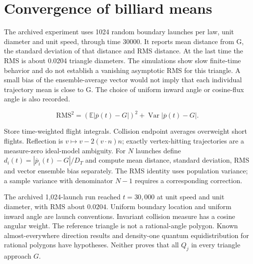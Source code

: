 \documentclass[11pt,oneside,openany]{book}
\begin{document}
\section{Convergence of billiard means}\label{sec:slide59}

The archived experiment uses 1024 random boundary launches per law, unit diameter and unit speed, through time 30000. It reports mean distance from G, the standard deviation of that distance and RMS distance. At the last time the RMS is about 0.0204 triangle diameters. The simulations show slow finite-time behavior and do not establish a vanishing asymptotic RMS for this triangle. A small bias of the ensemble-average vector would not imply that each individual trajectory mean is close to G. The choice of uniform inward angle or cosine-flux angle is also recorded.


\[\mathrm{RMS}^2=(\mathbb E|\overline p(t)-G|)^2+\operatorname{Var}|\overline p(t)-G|.\]



Store time-weighted flight integrals. Collision endpoint averages
overweight short flights. Reflection is
$v\mapsto v-2(v\cdot n)n$; exactly vertex-hitting trajectories are
a measure-zero ideal-model ambiguity.
For $N$ launches define
$d_i(t)=|\overline p_i(t)-G|/D_T$ and compute mean distance,
standard deviation, RMS and vector ensemble bias separately.
The RMS identity uses population variance; a sample variance with
denominator $N-1$ requires a corresponding correction.

The archived 1,024-launch run reached $t=30{,}000$ at unit speed and
unit diameter, with RMS about $0.0204$.
Uniform boundary location and uniform inward angle are launch
conventions. Invariant collision measure has a cosine angular weight.
The reference triangle is not a rational-angle polygon.
Known almost-everywhere direction results \cite{kms} and
density-one quantum equidistribution for rational polygons
\cite{marklof} have hypotheses. Neither proves that all $Q_j$ in
every triangle approach $G$.
\end{document}

